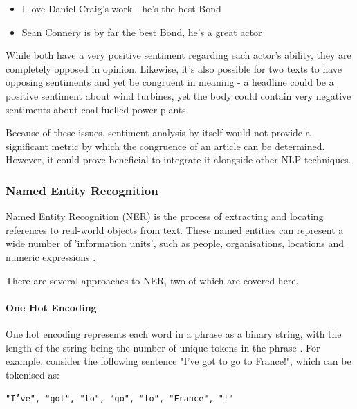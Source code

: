 \begin{itemize}
	\item I love Daniel Craig's work - he's the best Bond
	\item Sean Connery is by far the best Bond, he's a great actor
\end{itemize}

While both have a very positive sentiment regarding each actor's ability, they are completely opposed in opinion. Likewise, it's also possible for two texts to have opposing sentiments and yet be congruent in meaning - a headline could  be a positive sentiment about wind turbines, yet the body could contain very negative sentiments about coal-fuelled power plants.

Because of these issues, sentiment analysis by itself would not provide a significant metric by which the congruence of an article can be determined. However, it could prove beneficial to integrate it alongside other NLP techniques. 

\subsubsection{Named Entity Recognition}
Named Entity Recognition (NER) is the process of extracting and locating references to real-world objects from text. These named entities can represent a wide number of 'information units', such as people, organisations, locations and numeric expressions \cite{nadeau2007}. 

There are several approaches to NER, two of which are covered here.

\paragraph{One Hot Encoding}
One hot encoding represents each word in a phrase as a binary string, with the length of the string being the number of unique tokens in the phrase \cite{bommana2019}.  For example, consider the following sentence "I've got to go to France!", which can be tokenised as:
\begin{center}\texttt{"I've", "got", "to", "go", "to", "France", "!"}
\end{center}

